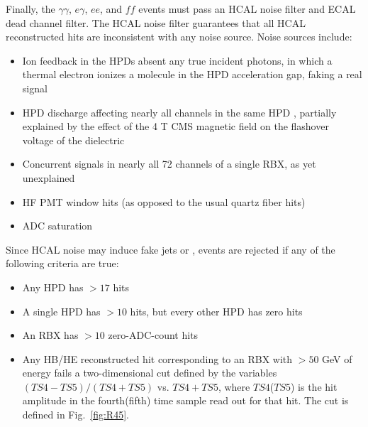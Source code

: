 \documentclass[dissertation.tex]{subfiles}
\begin{document}
Finally, the $\gamma\gamma$, $e\gamma$, $ee$, and $\mathit{ff}$ events must pass an HCAL noise filter and ECAL dead channel filter.  The HCAL noise filter guarantees that all HCAL reconstructed hits are inconsistent with any noise source.  Noise sources \cite{HCAL_noise_CRAFT} include:

\begin{itemize}
\item Ion feedback in the HPDs absent any true incident photons, in which a thermal electron ionizes a molecule in the HPD acceleration gap, faking a real signal
\item HPD discharge affecting nearly all channels in the same HPD \cite{HCAL_noise_AN}, partially explained by the effect of the 4 T CMS magnetic field on the flashover voltage of the dielectric \cite{Korzekwa}
\item Concurrent signals in nearly all 72 channels of a single RBX, as yet unexplained
\item HF PMT window hits (as opposed to the usual quartz fiber hits)
\item ADC saturation
\end{itemize}
%
Since HCAL noise may induce fake jets or \MET, events are rejected if any of the following criteria are true:

\begin{itemize}
\item Any HPD has $> 17$ hits
\item A single HPD has $> 10$ hits, but every other HPD has zero hits
\item An RBX has $> 10$ zero-ADC-count hits
\item Any HB/HE reconstructed hit corresponding to an RBX with $> 50$ GeV of energy fails a two-dimensional cut defined by the variables $(TS4 - TS5)/(TS4 + TS5)$ vs. $TS4 + TS5$, where $TS4$($TS5$) is the hit amplitude in the fourth(fifth) time sample read out for that hit.  The cut is defined in Fig.~\ref{fig:R45}.
\end{itemize}
\end{document}

